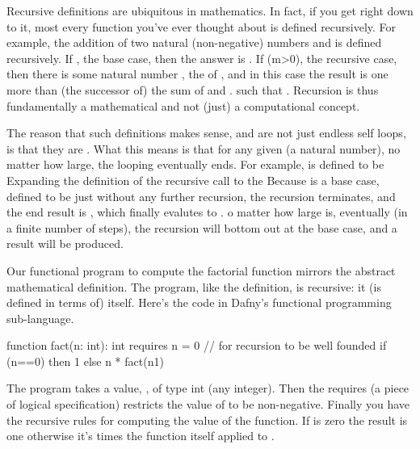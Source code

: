 \documentclass[letterpaper,10pt,english]{sphinxmanual}
\begin{document}
Recursive definitions are ubiquitous in mathematics. In fact, if you
get right down to it, most every function you’ve ever thought about is
defined recursively. For example, the addition of two natural
(non-negative) numbers  and  is defined recursively. If ,
the base case, then the answer is . If (m\textgreater{}0), the recursive case,
then there is some natural number , the  of , and
in this case the result is one more than (the successor of) the sum of
 and . such that . Recursion is thus fundamentally a
mathematical and not (just) a computational concept.

The reason that such definitions makes sense, and are not just endless
self loops, is that they are .  What this means is that
for any given  (a natural number), no matter how large, the looping
eventually ends. For example,  is defined to be  Expanding the definition of the recursive call to the
 Because  is a base case,
defined to be just  without any further recursion, the recursion
terminates, and the end result is , which finally
evalutes to . o matter how large  is, eventually (in a finite
number of steps), the recursion will bottom out at the base case, and
a result will be produced.

Our functional program to compute the factorial function mirrors the
abstract mathematical definition. The program, like the definition, is
recursive: it  (is defined in terms of) itself. Here’s the code
in Dafny’s functional programming sub-language.

\begin{sphinxVerbatim}[commandchars=\\\{\}]
function fact(n: int): int
  requires n \PYGZgt{}= 0 // for recursion to be well founded
\PYGZob{}
  if (n==0)
  then 1
  else n * fact(n\PYGZhy{}1)
\PYGZcb{}
\end{sphinxVerbatim}

The program takes a value, , of type int (any integer). Then the
requires  (a piece of logical specification) restricts the
value of  to be non-negative. Finally you have the recursive rules
for computing the value of the function. If  is zero the result is
one otherwise it’s  times the function itself applied to .
\end{document}
